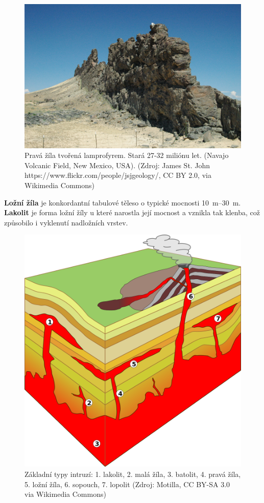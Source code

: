 \begin{figure}[h]
	\centering
	\includegraphics[width=1\linewidth]{obrazky/sopky/zila}
	\caption{Pravá žíla tvořená lamprofyrem. Stará 27-32 miliónu let. (Navajo Volcanic Field, New Mexico, USA). (Zdroj: James St. John https://www.flickr.com/people/jsjgeology/, CC BY 2.0, via Wikimedia Commons)}
	\label{fig:zila}
\end{figure}

\textbf{Ložní žíla} je konkordantní tabulové těleso o typické mocnosti \SIrange{10}{30}{\metre}. \textbf{Lakolit} je forma ložní žíly u které narostla její mocnost a vznikla tak klenba, což způsobilo i vyklenutí nadložních vrstev.

\begin{figure}[h]
	\includegraphics[width=\linewidth]{obrazky/sopky/Intrusion_types}
	\caption{Základní typy intruzí: 1. lakolit, 2. malá žíla, 3. batolit, 4. pravá žíla, 5. ložní žíla, 6. sopouch, 7. lopolit (Zdroj: Motilla, CC BY-SA 3.0 via Wikimedia Commons)}
	\label{fig:intrusion}
\end{figure}

